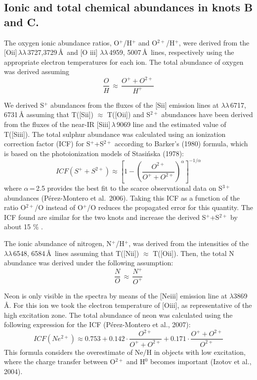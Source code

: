 \documentclass[structabstract]{aa}
\begin{document}


\subsection{Ionic and total chemical abundances in knots B and C.}

The oxygen ionic abundance ratios, O$^{+}$/H$^{+}$ and O$^{2+}$/H$^{+}$, 
were derived from the [O{\sc ii}]\,$\lambda\lambda$\,3727,3729\,\AA\ and [O{\sc
    iii}] $\lambda\lambda$\,4959, 5007\,\AA\ lines, respectively using the
appropriate electron temperatures for each ion. The total
abundance of oxygen was derived assuming
\[ 
\frac{O}{H}\,\approx\,\frac{O^++O^{2+}}{H^+}
\]

We derived S$^+$ abundances from  the fluxes of the [S{\sc ii}] emission lines at $\lambda\lambda$\,6717, 6731\,{\AA} assuming  that T([S{\sc ii}]) $\approx$ T([O{\sc ii}]) and S$^{2+}$ abundances have been derived from the fluxes of the near-IR [S{\sc iii}]\,$\lambda$\,9069 line and the estimated value of T([S{\sc iii}]).
The total sulphur abundance was calculated using an ionization correction factor (ICF) for S$^+$+S$^{2+}$ according to Barker's (1980) formula, which is based on the photoionization
models of Stasi\'nska (1978): 
 \[
ICF(S^++S^{2+}) \approx \left[ 1-\left( \frac{O^{2+}}{O^++O^{2+}}
  \right)^\alpha\right]^{-1/\alpha} 
\]
\noindent where $\alpha$\,=\,2.5 provides the best fit to the scarce observational
data on S$^{3+}$ abundances (P\'erez-Montero et al.\ 2006).  Taking this ICF as
a function of the ratio O$^{2+}$/O instead of O$^+$/O reduces the propagated error
for this quantity. The ICF found are similar for the two knots and increase the derived S$^+$+S$^{2+}$ by about 15 \% .
 
The ionic abundance of nitrogen, N$^{+}$/H$^{+}$, was derived from the
intensities of the $\lambda\lambda$\,6548, 6584\,\AA\ lines assuming that  T([N{\sc ii}]) $\approx$ T([O{\sc ii}]).
Then, the total N abundance was derived under the following
assumption:
\[
\frac{N}{O}\,\approx\,\frac{N^+}{O^+}
\]

Neon is only visible in the spectra by means of the [Ne{\sc iii}] emission line at
$\lambda$3869\,{\AA}. For this ion we took the electron temperature 
of [O{\sc iii}], as
representative of the high excitation zone. The total abundance of neon was 
calculated using the following expression for the  ICF (P\'erez-Montero et al., 2007):
\[
ICF(Ne^{2+}) \approx 0.753 + 0.142\cdot  \frac{O^{2+}}{O^++O^{2+}} + 0.171 \cdot \frac{O^++O^{2+}}{O^{2+}}
\]
This formula considers the overestimate of
Ne/H in objects with low excitation, where the charge transfer between O$^{2+}$
and H$^0$ becomes important (Izotov et al., 2004). 
 
\end{document}
